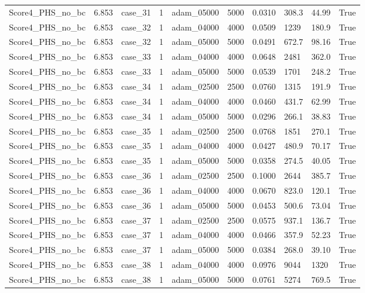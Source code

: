 \begin{longtable}{llllllllll}
Score4\_PHS\_no\_bc & 6.853 & case\_31 & 1 & adam\_05000 & 5000 & 0.0310 & 308.3 & 44.99 & True \\
Score4\_PHS\_no\_bc & 6.853 & case\_32 & 1 & adam\_04000 & 4000 & 0.0509 & 1239 & 180.9 & True \\
Score4\_PHS\_no\_bc & 6.853 & case\_32 & 1 & adam\_05000 & 5000 & 0.0491 & 672.7 & 98.16 & True \\
Score4\_PHS\_no\_bc & 6.853 & case\_33 & 1 & adam\_04000 & 4000 & 0.0648 & 2481 & 362.0 & True \\
Score4\_PHS\_no\_bc & 6.853 & case\_33 & 1 & adam\_05000 & 5000 & 0.0539 & 1701 & 248.2 & True \\
Score4\_PHS\_no\_bc & 6.853 & case\_34 & 1 & adam\_02500 & 2500 & 0.0760 & 1315 & 191.9 & True \\
Score4\_PHS\_no\_bc & 6.853 & case\_34 & 1 & adam\_04000 & 4000 & 0.0460 & 431.7 & 62.99 & True \\
Score4\_PHS\_no\_bc & 6.853 & case\_34 & 1 & adam\_05000 & 5000 & 0.0296 & 266.1 & 38.83 & True \\
Score4\_PHS\_no\_bc & 6.853 & case\_35 & 1 & adam\_02500 & 2500 & 0.0768 & 1851 & 270.1 & True \\
Score4\_PHS\_no\_bc & 6.853 & case\_35 & 1 & adam\_04000 & 4000 & 0.0427 & 480.9 & 70.17 & True \\
Score4\_PHS\_no\_bc & 6.853 & case\_35 & 1 & adam\_05000 & 5000 & 0.0358 & 274.5 & 40.05 & True \\
Score4\_PHS\_no\_bc & 6.853 & case\_36 & 1 & adam\_02500 & 2500 & 0.1000 & 2644 & 385.7 & True \\
Score4\_PHS\_no\_bc & 6.853 & case\_36 & 1 & adam\_04000 & 4000 & 0.0670 & 823.0 & 120.1 & True \\
Score4\_PHS\_no\_bc & 6.853 & case\_36 & 1 & adam\_05000 & 5000 & 0.0453 & 500.6 & 73.04 & True \\
Score4\_PHS\_no\_bc & 6.853 & case\_37 & 1 & adam\_02500 & 2500 & 0.0575 & 937.1 & 136.7 & True \\
Score4\_PHS\_no\_bc & 6.853 & case\_37 & 1 & adam\_04000 & 4000 & 0.0466 & 357.9 & 52.23 & True \\
Score4\_PHS\_no\_bc & 6.853 & case\_37 & 1 & adam\_05000 & 5000 & 0.0384 & 268.0 & 39.10 & True \\
Score4\_PHS\_no\_bc & 6.853 & case\_38 & 1 & adam\_04000 & 4000 & 0.0976 & 9044 & 1320 & True \\
Score4\_PHS\_no\_bc & 6.853 & case\_38 & 1 & adam\_05000 & 5000 & 0.0761 & 5274 & 769.5 & True \\

\end{longtable}
